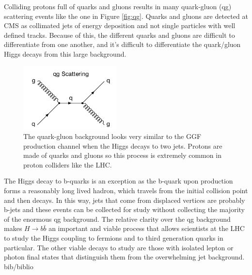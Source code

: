 \documentclass[12pt]{article}
\begin{document}
Colliding protons full of quarks and gluons results in many quark-gluon (qg) scattering events like the one in Figure \ref{fig:qg}. Quarks and gluons are detected at CMS as collimated jets of energy deposition and not single particles with well defined tracks. Because of this, the different quarks and gluons are difficult to differentiate from one another, and it's difficult to differentiate the quark/gluon Higgs decays from this large background. 
\begin{figure}[h!]
\label{fig:qg}
  \centering
  \includegraphics[width=2in]{images/qg_scattering.png}
  \caption
   {The quark-gluon background looks very similar to the GGF production channel when the Higgs decays to two jets. Protons are made of quarks and gluons so this process is extremely common in proton colliders like the LHC.}
  \label{fig:feynqg}
\end{figure}
The Higgs decay to b-quarks is an exception as the b-quark upon production forms a reasonably long lived hadron, which travels from the initial collision point and then decays. In this way, jets that come from displaced vertices are probably b-jets and these events can be collected for study without collecting the majority of the enormous qg background. The relative clarity over the qg background makes $H\rightarrow b\bar{b}$ an important and viable process that allows scientists at the LHC to study the Higgs coupling to fermions and to third generation quarks in particular. The other viable decays to study are those with isolated lepton or photon final states that distinguish them from the overwhelming jet background. 
 {bib/biblio}
\end{document}

